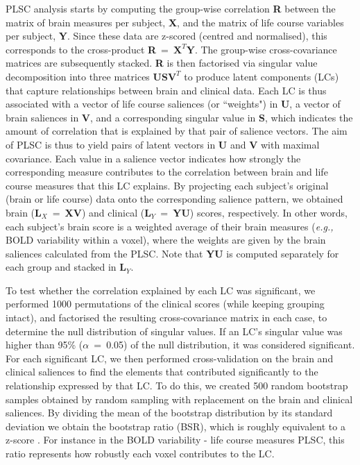 PLSC analysis starts by computing the group-wise correlation \textbf{R} between the matrix of brain measures per subject, \textbf{X}, and the matrix of life course variables per subject, \textbf{Y}. Since these data are z-scored (centred and normalised), this corresponds to the cross-product \textbf{R}~=~$\textbf{X}^{T}\textbf{Y}$. The group-wise cross-covariance matrices are subsequently stacked. \textbf{R} is then factorised via singular value decomposition into three matrices \textbf{U}\textbf{S}$\textbf{V}^{T}$ to produce latent components (LCs) that capture relationships between brain and clinical data. Each LC is thus associated with a vector of life course saliences (or ``weights") in \textbf{U}, a vector of brain saliences in \textbf{V}, and a corresponding singular value in \textbf{S}, which indicates the amount of correlation that is explained by that pair of salience vectors. The aim of PLSC is thus to yield pairs of latent vectors in \textbf{U} and \textbf{V} with maximal covariance. Each value in a salience vector indicates how strongly the corresponding measure contributes to the correlation between brain and life course measures that this LC explains. By projecting each subject's original (brain or life course) data onto the corresponding salience pattern, we obtained brain ($\textbf{L}_X$~=~\textbf{XV}) and clinical ($\textbf{L}_Y$~=~\textbf{YU}) scores, respectively. In other words, each subject's brain score is a weighted average of their brain measures (\textit{e.g.,} BOLD variability within a voxel), where the weights are given by the brain saliences calculated from the PLSC. Note that \textbf{YU} is computed separately for each group and stacked in $\textbf{L}_Y$. 

To test whether the correlation explained by each LC was significant, we performed 1000 permutations of the clinical scores (while keeping grouping intact), and factorised the resulting cross-covariance matrix in each case, to determine the null distribution of singular values. If an LC's singular value was higher than 95\% ($\alpha$~=~0.05) of the null distribution, it was considered significant. For each significant LC, we then performed cross-validation on the brain and clinical saliences to find the elements that contributed significantly to the relationship expressed by that LC. To do this, we created 500 random bootstrap samples obtained by random sampling with replacement on the brain and clinical saliences. By dividing the mean of the bootstrap distribution by its standard deviation we obtain the bootstrap ratio (BSR), which is roughly equivalent to a z-score \citep{McIntosh2004, Krishnan2011}.  For instance in the BOLD variability - life course measures PLSC,  this ratio represents how robustly each voxel contributes to the LC.

